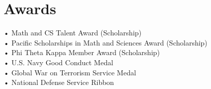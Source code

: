 \documentclass[letterpaper]{deedy-resume} %
\begin{document}
\begin{minipage}[t]{0.33\textwidth}
\section{Awards} 
•  Math and CS Talent Award (Scholarship)\\
•  Pacific Scholarships in Math and Sciences Award (Scholarship)\\
•  Phi Theta Kappa Member Award (Scholarship)\\
•  U.S. Navy Good Conduct Medal\\
•  Global War on Terrorism Service Medal\\
•  National Defense Service Ribbon

\sectionspace %

\end{minipage} %
\hfill
%
%
\end{document}
